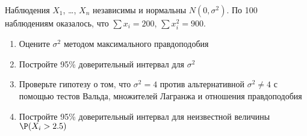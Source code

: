 \documentclass[pdftex,11pt,openany]{book}\usepackage[]{graphicx}\usepackage[]{color}
\begin{document}
\begin{problem}
Наблюдения $X_1$, \ldots, $X_n$ независимы и нормальны $N(0,\sigma^2)$. По 100 наблюдениям оказалось, что $\sum x_i=200$, $\sum x_i^2=900$.
\begin{enumerate}
\item Оцените $\sigma^2$ методом максимального правдоподобия
\item Постройте 95\% доверительный интервал для $\sigma^2$
\item Проверьте гипотезу о том, что $\sigma^2=4$ против альтернативной $\sigma^2\neq 4$ с помощью тестов Вальда, множителей Лагранжа и отношения правдоподобия
\item Постройте 95\% доверительный интервал для неизвестной величины $\P(X_i>2.5)$
\end{enumerate}
\end{problem}
\end{document}
